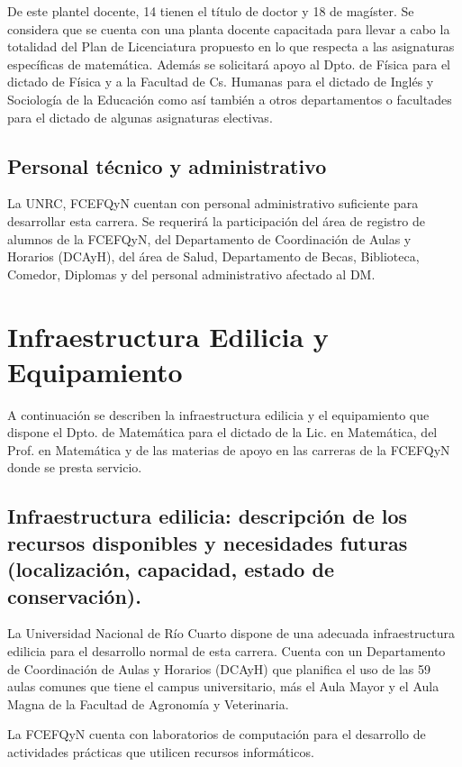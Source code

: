 \documentclass[a4paper, 12pt]{article}
\begin{document}
De este plantel docente,  14 tienen  el título de doctor y 18 de magíster. Se considera que se cuenta con una planta docente
capacitada para llevar a cabo la totalidad del Plan de
Licenciatura propuesto en lo que  respecta a las
asignaturas específicas de matemática. Además se solicitará apoyo
al Dpto. de Física para el dictado de Física y a la Facultad de
Cs. Humanas para el dictado de Inglés y Sociología de la Educación como así también a otros departamentos o facultades para el
dictado de algunas asignaturas electivas. 

\subsection{Personal técnico y administrativo}

La UNRC, FCEFQyN cuentan con personal
administrativo suficiente para desarrollar esta carrera. Se requerirá la participación del área de registro de alumnos de la FCEFQyN, del Departamento de Coordinación de Aulas y Horarios (DCAyH), del área de Salud, Departamento de Becas, Biblioteca, Comedor, Diplomas y del personal administrativo afectado al DM.  



\section{Infraestructura Edilicia y Equipamiento}


A continuación se describen la infraestructura edilicia y el equipamiento  que dispone el Dpto. de Matemática para el dictado de la  Lic. en Matemática,  del Prof. en Matemática y de las materias de apoyo en las carreras de la FCEFQyN donde se presta servicio.   

\subsection{Infraestructura edilicia: descripción de los recursos disponibles y necesidades futuras (localización, capacidad, estado de conservación).} 

La Universidad Nacional de Río Cuarto dispone de una adecuada infraestructura edilicia  para el desarrollo normal de esta carrera. Cuenta con un Departamento de Coordinación de Aulas y Horarios (DCAyH) que planifica el uso de las 59 aulas comunes que tiene el campus universitario, más el Aula Mayor y el Aula Magna de la Facultad de Agronomía y Veterinaria.

La FCEFQyN  cuenta con laboratorios de computación para el desarrollo de actividades prácticas que utilicen recursos informáticos. 
\end{document}
